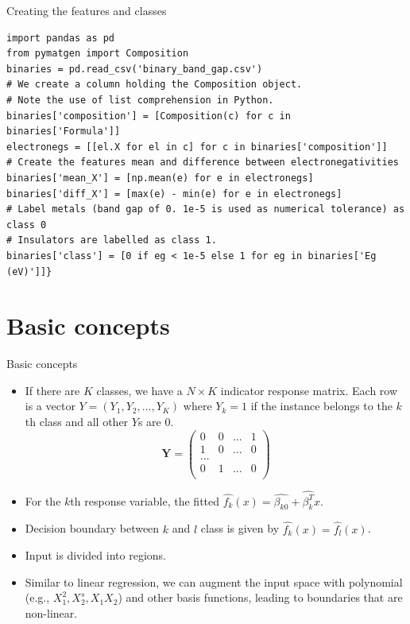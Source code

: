 \documentclass[aspectratio=169]{beamer}
\let \vec \mathbf
\begin{document}
\begin{frame}[fragile]{Creating the features and classes}
\begin{verbatim}
import pandas as pd
from pymatgen import Composition
binaries = pd.read_csv('binary_band_gap.csv')
# We create a column holding the Composition object. 
# Note the use of list comprehension in Python.
binaries['composition'] = [Composition(c) for c in binaries['Formula']]
electronegs = [[el.X for el in c] for c in binaries['composition']]
# Create the features mean and difference between electronegativities
binaries['mean_X'] = [np.mean(e) for e in electronegs]
binaries['diff_X'] = [max(e) - min(e) for e in electronegs]
# Label metals (band gap of 0. 1e-5 is used as numerical tolerance) as class 0
# Insulators are labelled as class 1.
binaries['class'] = [0 if eg < 1e-5 else 1 for eg in binaries['Eg (eV)']]}
\end{verbatim}
\end{frame} 


\section{Basic concepts}

\begin{frame}{Basic concepts}
    \begin{itemize}
        \item If there are $K$ classes, we have a $N \times K$ indicator response matrix. Each row is a vector $Y = (Y_1, Y_2, ..., Y_K)$ where $Y_k = 1$ if the instance belongs to the $k$th class and all other $Y$s are 0.
        \begin{equation*}
            \vec{Y} = \begin{pmatrix}
            0 & 0 & ... & 1\\
            1 & 0 & ... & 0\\
            ...& & &\\
            0 & 1 & ... & 0\\
            \end{pmatrix}
        \end{equation*}
        \item For the $k$th response variable, the fitted $\hat{f_k}(x) = \hat{\beta_{k0}} + \hat{\beta_{k}^T}x$.
        \item Decision boundary between $k$ and $l$ class is given by $\hat{f_k}(x) = \hat{f_l}(x)$. 
        \item Input is divided into regions.
        \item Similar to linear regression, we can augment the input space with polynomial (e.g., $X_1^2, X_2^s, X_1X_2$) and other basis functions, leading to boundaries that are non-linear.
    \end{itemize}
\end{frame} 
\end{document}
